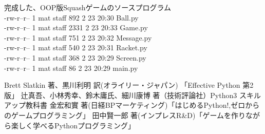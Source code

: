 \documentclass[uplatex,a4paper,11pt,oneside,openany]{jsbook}
\begin{document}
完成した、OOP版Squashゲームのソースプログラム\\

-rw-r--r--  1 mat  staff   892  2 23 20:30 Ball.py\\
-rw-r--r--  1 mat  staff  2331  2 23 20:33 Game.py\\
-rw-r--r--  1 mat  staff   751  2 23 20:32 Message.py\\
-rw-r--r--  1 mat  staff   540  2 23 20:31 Racket.py\\
-rw-r--r--  1 mat  staff   368  2 23 20:29 Screen.py\\
-rw-r--r--  1 mat  staff    86  2 23 20:29 main.py\\


%
%
\begin{thebibliography}{99}
   Brett Slatkin 著、黒川利明 訳(オライリー・ジャパン) 「Effective Python 第2版」
   辻真吾、小林秀幸、鈴木庸氏、細川康博 著（技術評論社）Python3 スキルアップ教科書
   金宏和實 著(日経BPマーケティング)「はじめるPython!,ゼロからのゲームプログラミング」
   田中賢一郎 著(インプレスR\&D)「ゲームを作りながら楽しく学べるPythonプログラミング」
\end{thebibliography}
%
\end{document}
